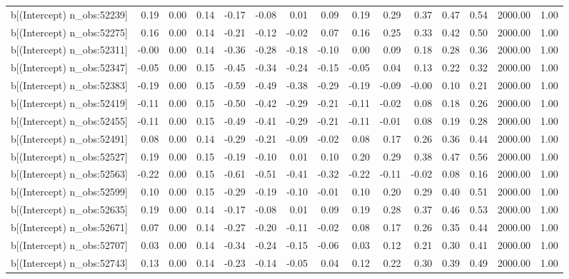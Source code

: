 \begin{table}[ht]
\begin{tabular}{rrrrrrrrrrrrrrr}
  b[(Intercept) n\_obs:52239] & 0.19 & 0.00 & 0.14 & -0.17 & -0.08 & 0.01 & 0.09 & 0.19 & 0.29 & 0.37 & 0.47 & 0.54 & 2000.00 & 1.00 \\ 
  b[(Intercept) n\_obs:52275] & 0.16 & 0.00 & 0.14 & -0.21 & -0.12 & -0.02 & 0.07 & 0.16 & 0.25 & 0.33 & 0.42 & 0.50 & 2000.00 & 1.00 \\ 
  b[(Intercept) n\_obs:52311] & -0.00 & 0.00 & 0.14 & -0.36 & -0.28 & -0.18 & -0.10 & 0.00 & 0.09 & 0.18 & 0.28 & 0.36 & 2000.00 & 1.00 \\ 
  b[(Intercept) n\_obs:52347] & -0.05 & 0.00 & 0.15 & -0.45 & -0.34 & -0.24 & -0.15 & -0.05 & 0.04 & 0.13 & 0.22 & 0.32 & 2000.00 & 1.00 \\ 
  b[(Intercept) n\_obs:52383] & -0.19 & 0.00 & 0.15 & -0.59 & -0.49 & -0.38 & -0.29 & -0.19 & -0.09 & -0.00 & 0.10 & 0.21 & 2000.00 & 1.00 \\ 
  b[(Intercept) n\_obs:52419] & -0.11 & 0.00 & 0.15 & -0.50 & -0.42 & -0.29 & -0.21 & -0.11 & -0.02 & 0.08 & 0.18 & 0.26 & 2000.00 & 1.00 \\ 
  b[(Intercept) n\_obs:52455] & -0.11 & 0.00 & 0.15 & -0.49 & -0.41 & -0.29 & -0.21 & -0.11 & -0.01 & 0.08 & 0.19 & 0.28 & 2000.00 & 1.00 \\ 
  b[(Intercept) n\_obs:52491] & 0.08 & 0.00 & 0.14 & -0.29 & -0.21 & -0.09 & -0.02 & 0.08 & 0.17 & 0.26 & 0.36 & 0.44 & 2000.00 & 1.00 \\ 
  b[(Intercept) n\_obs:52527] & 0.19 & 0.00 & 0.15 & -0.19 & -0.10 & 0.01 & 0.10 & 0.20 & 0.29 & 0.38 & 0.47 & 0.56 & 2000.00 & 1.00 \\ 
  b[(Intercept) n\_obs:52563] & -0.22 & 0.00 & 0.15 & -0.61 & -0.51 & -0.41 & -0.32 & -0.22 & -0.11 & -0.02 & 0.08 & 0.16 & 2000.00 & 1.00 \\ 
  b[(Intercept) n\_obs:52599] & 0.10 & 0.00 & 0.15 & -0.29 & -0.19 & -0.10 & -0.01 & 0.10 & 0.20 & 0.29 & 0.40 & 0.51 & 2000.00 & 1.00 \\ 
  b[(Intercept) n\_obs:52635] & 0.19 & 0.00 & 0.14 & -0.17 & -0.08 & 0.01 & 0.09 & 0.19 & 0.28 & 0.37 & 0.46 & 0.53 & 2000.00 & 1.00 \\ 
  b[(Intercept) n\_obs:52671] & 0.07 & 0.00 & 0.14 & -0.27 & -0.20 & -0.11 & -0.02 & 0.08 & 0.17 & 0.26 & 0.35 & 0.44 & 2000.00 & 1.00 \\ 
  b[(Intercept) n\_obs:52707] & 0.03 & 0.00 & 0.14 & -0.34 & -0.24 & -0.15 & -0.06 & 0.03 & 0.12 & 0.21 & 0.30 & 0.41 & 2000.00 & 1.00 \\ 
  b[(Intercept) n\_obs:52743] & 0.13 & 0.00 & 0.14 & -0.23 & -0.14 & -0.05 & 0.04 & 0.12 & 0.22 & 0.30 & 0.39 & 0.49 & 2000.00 & 1.00 \\ 

\end{tabular}
\end{table}
